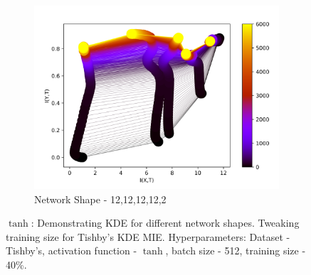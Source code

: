 \documentclass[dissertation.tex]{subfiles}
\begin{document}
\begin{figure}[ht]
  \begin{subfigure}[t]{0.32\textwidth}
    \centering
    \includegraphics[width=\textwidth]{figs/eval/networkShape/KDE12,12,12.png}
    \caption{
      Network Shape - 12,12,12,12,2
    }
    \label{figNetworkShape3}
  \end{subfigure}
  \hfill
  \caption{
      $\tanh$: Demonstrating KDE for different network shapes.  Tweaking training
      size for Tishby's KDE MIE. Hyperparameters: Dataset - Tishby's, activation
      function - $\tanh$, batch size - 512, training size - 40\%.
    }
  \label{figNetworkShapes}
\end{figure}
\end{document}
